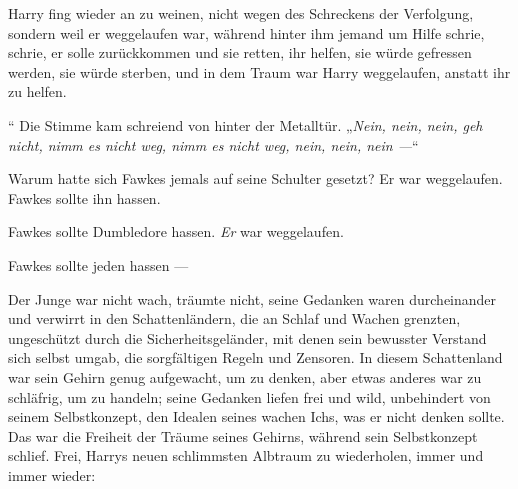Harry fing wieder an zu weinen, nicht wegen des Schreckens der Verfolgung, sondern weil er weggelaufen war, während hinter ihm jemand um Hilfe schrie, schrie, er solle zurückkommen und sie retten, ihr helfen, sie würde gefressen werden, sie würde sterben, und in dem Traum war Harry weggelaufen, anstatt ihr zu helfen.

“ Die Stimme kam schreiend von hinter der Metalltür.
„\emph{Nein, nein, nein, geh nicht, nimm es nicht weg, nimm es nicht weg, nein, nein, nein —}“

Warum hatte sich Fawkes jemals auf seine Schulter gesetzt? Er war weggelaufen. Fawkes sollte ihn hassen.

Fawkes sollte Dumbledore hassen. \emph{Er} war weggelaufen.

Fawkes sollte jeden hassen —

Der Junge war nicht wach, träumte nicht, seine Gedanken waren durcheinander und verwirrt in den Schattenländern, die an Schlaf und Wachen grenzten, ungeschützt durch die Sicherheitsgeländer, mit denen sein bewusster Verstand sich selbst umgab, die sorgfältigen Regeln und Zensoren. In diesem Schattenland war sein Gehirn genug aufgewacht, um zu denken, aber etwas anderes war zu schläfrig, um zu handeln; seine Gedanken liefen frei und wild, unbehindert von seinem Selbstkonzept, den Idealen seines wachen Ichs, was er nicht denken sollte. Das war die Freiheit der Träume seines Gehirns, während sein Selbstkonzept schlief. Frei, Harrys neuen schlimmsten Albtraum zu wiederholen, immer und immer wieder:

